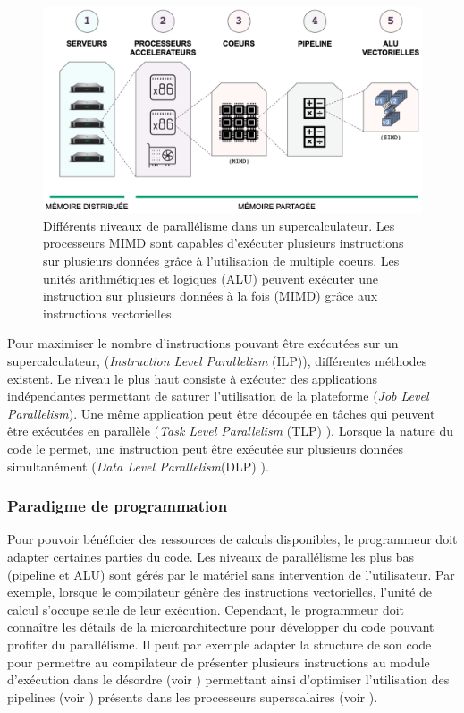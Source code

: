             \begin{figure}
                \center
                \includegraphics[width=14cm]{images/parallele_hpc.png}
                \caption{\label{fig:parallele_hpc} Différents niveaux de parallélisme dans un supercalculateur. Les processeurs MIMD sont capables d'exécuter plusieurs instructions sur plusieurs données grâce à l'utilisation de multiple coeurs. Les unités arithmétiques et logiques (ALU) peuvent exécuter une instruction sur plusieurs données à la fois (MIMD) grâce aux instructions vectorielles.}
            \end{figure}
            
            Pour maximiser le nombre d'instructions pouvant être exécutées sur un supercalculateur, (\textit{Instruction Level Parallelism} (ILP)), différentes méthodes existent. Le niveau le plus haut consiste à exécuter des applications indépendantes permettant de saturer l'utilisation de la plateforme (\textit{Job Level Parallelism}). Une même application peut être découpée en tâches qui peuvent être exécutées en parallèle (\textit{Task Level Parallelism} (TLP) \cite{Kambadur2009}). Lorsque la nature du code le permet, une instruction peut être exécutée sur plusieurs données simultanément (\textit{Data Level Parallelism}(DLP) \cite{Espasa1997}).

    \subsubsection{Paradigme de programmation}
       
        Pour pouvoir bénéficier des ressources de calculs disponibles, le programmeur doit adapter certaines parties du code. Les niveaux de parallélisme les plus bas (pipeline et ALU) sont gérés par le matériel sans intervention de l'utilisateur. Par exemple, lorsque le compilateur génère des instructions vectorielles, l'unité de calcul s'occupe seule de leur exécution. Cependant, le programmeur doit connaître les détails de la microarchitecture pour développer du code pouvant profiter du parallélisme.  Il peut par exemple adapter la structure de son code pour permettre au compilateur de présenter plusieurs instructions au module d'exécution dans le désordre (voir ) permettant ainsi d'optimiser l'utilisation des pipelines (voir ) présents dans les processeurs superscalaires (voir ).
        
